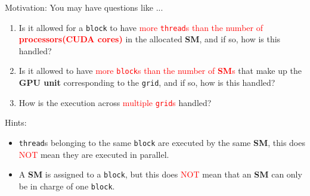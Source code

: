\documentclass[dvipdfmx, 11pt, aspectratio=169]{beamer}   %
\begin{document}
\begin{frame}{Motivation: You may have questions like ...}
  \begin{enumerate}
    \item Is it allowed for a \lstinline|block| to have \textcolor{red}{more \lstinline|thread|s than the number of \textbf{processors(CUDA cores)}} in the allocated \textbf{SM}, and if so, how is this handled?
    \item Is it allowed to have \textcolor{red}{more \lstinline|block|s than the number of \textbf{SM}s} that make up the \textbf{GPU unit} corresponding to the \lstinline|grid|, and if so, how is this handled?
    \item How is the execution across \textcolor{red}{multiple \lstinline|grid|s} handled?
  \end{enumerate}
  Hints:
  \begin{itemize}
    \item \lstinline|thread|s belonging to the same \lstinline|block| are executed by the same \textbf{SM}, this does \textcolor{red}{NOT} mean they are executed in parallel. 
    \item A \textbf{SM} is assigned to a \lstinline|block|, but this does \textcolor{red}{NOT} mean that an \textbf{SM} can only be in charge of one \lstinline|block|.
  \end{itemize}
\end{frame}
\end{document}
